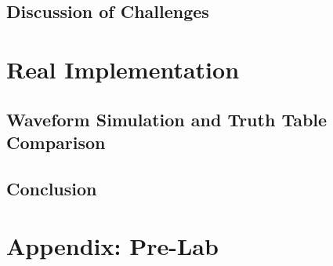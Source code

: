\documentclass[14pt, a4paper]{article}
\begin{document}
			\subsection{Discussion of Challenges}
			
			
			
		\section{Real Implementation}
		
			\subsection{Waveform Simulation and Truth Table Comparison}
			
			
			\subsection{Conclusion}
			
		\section{Appendix: Pre-Lab}
	
\end{document}
